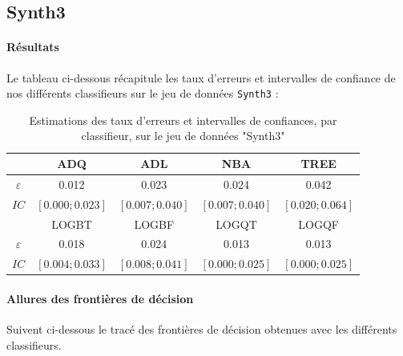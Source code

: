 \documentclass{report}
\begin{document}
\newpage
\subsection{Synth3}
\paragraph{Résultats}
Le tableau ci-dessous récapitule les taux d'erreurs et intervalles de confiance de nos différents classifieurs sur le jeu de données \verb+Synth3+ :

\begin{table}[h!]
    \centering
    \caption{Estimations des taux d'erreurs et intervalles de confiances, par classifieur, sur le jeu de données "Synth3"}
    \label{tab:table1}
    \def\arraystretch{1.5}
    \begin{tabular}{c||c|c|c|c}
        \hline
        & ADQ & ADL & NBA & TREE\\
        \hline
        $\varepsilon$ & 0.012 & 0.023 & 0.024
        & 0.042\\
        \hline
        $IC$ & $[0.000 ; 0.023]$ & $[0.007 ; 0.040]$ & $[0.007 ; 0.040]$
        & $[0.020 ; 0.064]$\\
        \hline
        \hline
        & LOGBT & LOGBF & LOGQT & LOGQF\\
        \hline
        $\varepsilon$ & 0.018 & 0.024 & 0.013 & 0.013\\
        \hline
        $IC$ & $[0.004 ; 0.033]$ & $[0.008 ; 0.041]$ & $[0.000 ; 0.025]$ & $[0.000 ; 0.025]$\\
        \hline
        \hline
    \end{tabular}
\end{table}

\paragraph{Allures des frontières de décision}
Suivent ci-dessous le tracé des frontières de décision obtenues avec les différents classifieurs.
\end{document}
